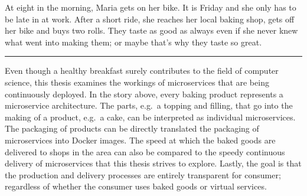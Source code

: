At eight in the morning, Maria gets on her bike. It is Friday and she only has
to be late in at work. After a short ride, she reaches her local baking shop,
gets off her bike and buys two rolls. They taste as good as always even if she
never knew what went into making them; or maybe that's why they taste so great.

\rule{2cm}{0.4pt}

Even though a healthy breakfast surely contributes to the field of computer
science, this thesis examines the workings of microservices that are being
continuously deployed. In the story above, every baking product represents a
microservice architecture. The parts, e.g.\ a topping and filling, that go into
the making of a product, e.g.\ a cake, can be interpreted as individual
microservices. The packaging of products can be directly translated the
packaging of microservices into Docker images. The speed at which the baked
goods are delivered to shops in the area can also be compared to the speedy
continuous delivery of microservices that this thesis strives to explore.
Lastly, the goal is that the production and delivery processes are entirely
transparent for consumer; regardless of whether the consumer uses baked goods
or virtual services.
